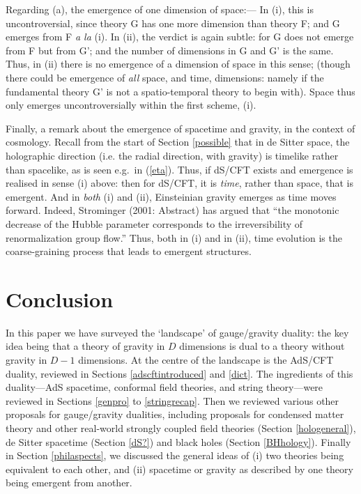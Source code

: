 \documentclass[12pt]{article}
\renewcommand{\^}[1]{\hat{#1}}
\newcommand{\eq}[1]{(\ref{#1})}
\begin{document}
Regarding (a), the emergence of one dimension of space:--- In (i), this is uncontroversial, since theory G has one more dimension than theory F; and G emerges from F {\em a la} (i). In (ii), the verdict is again subtle: for G does not emerge from F but from G'; and the number of dimensions in G and G' is the same. Thus, in (ii) there is no emergence of a dimension of space in this sense; (though there could be emergence of {\it all} space, and time, dimensions: namely if the fundamental theory G' is not a spatio-temporal theory to begin with). Space thus only emerges uncontroversially within the first scheme, (i).

Finally, a remark about the emergence of spacetime and gravity, in the context of cosmology. Recall from the start of Section \ref{possible} that in de Sitter space, the holographic  direction (i.e. the radial direction, with gravity) is timelike rather than spacelike, as is seen e.g.~in \eq{eta}. Thus, if dS/CFT exists and emergence is realised in  sense (i) above: then for dS/CFT, it is {\it time}, rather than space, that is emergent. And in {\it both} (i) and (ii), Einsteinian gravity emerges as time moves forward. Indeed, Strominger (2001: Abstract) has argued that ``the monotonic decrease of the Hubble parameter corresponds to the irreversibility of renormalization group flow.''  Thus, both in (i) and in (ii), time evolution is the coarse-graining process that leads to emergent structures.

\section{Conclusion}\label{concl}

In this paper we have surveyed the `landscape' of gauge/gravity duality: the key idea being that a theory  of gravity in $D$ dimensions is dual to a theory  without gravity in $D - 1$ dimensions. At the centre of the landscape is the AdS/CFT duality, reviewed in Sections \ref{adscftintroduced} and \ref{dict}. The ingredients of this duality---AdS spacetime, conformal field theories, and string theory---were reviewed in Sections \ref{genpro} to \ref{stringrecap}. Then we reviewed various other proposals for gauge/gravity dualities, including proposals for condensed matter theory and other real-world strongly coupled field theories (Section \ref{hologeneral}), de Sitter spacetime (Section \ref{dS?}) and black holes (Section \ref{BHhology}). Finally in Section \ref{philaspects}, we discussed the general ideas of (i) two theories being equivalent to each other, and (ii) spacetime or gravity as described by one theory being emergent from another.
\end{document}
